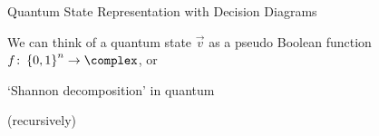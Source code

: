 \begin{frame}[fragile]{Quantum State Representation with
					\alert{Decision Diagrams}}

\vspace{-1em}
We can think of a quantum state $\vec v$ as a pseudo Boolean function $f \colon \set{0,1}^n \to \complex$, or

\begin{block}{`Shannon decomposition' in quantum}

\centering

\vspace{.5em}


\vspace{.5em}

\hfill (recursively)

\vspace{.5em}
\end{block}


\end{frame}
